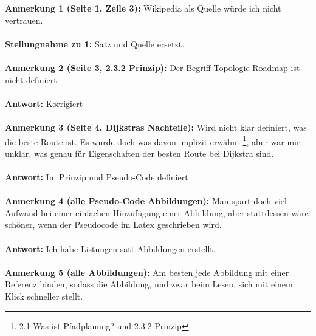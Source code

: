 \documentclass[a4paper,12pt]{book}
\begin{document}
\textbf{Anmerkung 1 (Seite 1, Zeile 3):}
Wikipedia als Quelle würde ich nicht vertrauen.
\\ \\
\textbf{Stellungnahme zu 1:}
Satz und Quelle ersetzt.
\\ \\
\textbf{Anmerkung 2 (Seite 3, 2.3.2 Prinzip): }
Der Begriff Topologie-Roadmap ist nicht definiert.
\\  \\  
\textbf{Antwort:} Korrigiert
\\  \\ 
\textbf{Anmerkung 3 (Seite 4, Dijkstras Nachteile):}
Wird nicht klar definiert, was die beste Route ist.
\newline
Es wurde doch was davon implizit erwähnt \footnote{ 2.1  Was ist Pfadplanung? und 2.3.2 Prinzip}, aber war mir unklar, was genau für Eigenschaften der besten Route bei Dijkstra sind.
\\ \\ 
\textbf{Antwort:} Im Prinzip und Pseudo-Code definiert
\\
\\
\textbf{Anmerkung 4 (alle Pseudo-Code Abbildungen):}
Man spart doch viel Aufwand bei einer einfachen Hinzufügung einer Abbildung, aber stattdessen wäre schöner, wenn der Pseudocode im Latex geschrieben wird. 
\\ \\ 
\textbf{Antwort:} Ich habe Listungen satt Abbildungen erstellt.
\\
\\
\textbf{Anmerkung 5 (alle Abbildungen):}
Am besten jede Abbildung mit einer Referenz binden, sodass die Abbildung, und zwar beim Lesen, sich mit einem Klick schneller stellt.
\end{document}
